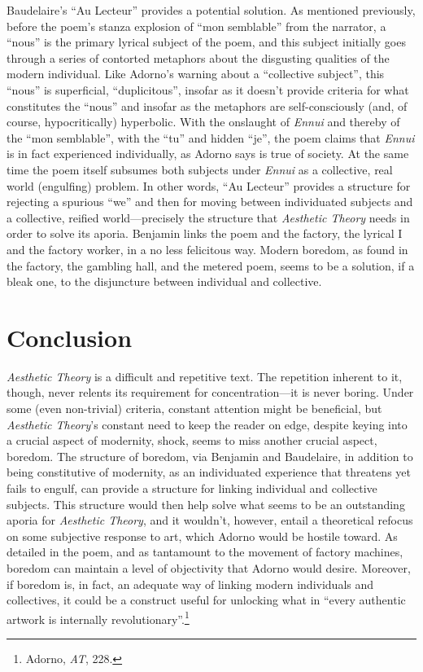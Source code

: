 \documentclass[12pt]{article}
\begin{document}
Baudelaire's ``Au Lecteur'' provides a potential solution. As mentioned previously, before the poem's stanza explosion of ``mon semblable'' from the narrator, a ``nous'' is the primary lyrical subject of the poem, and this subject initially goes through a series of contorted metaphors about the disgusting qualities of the modern individual. Like Adorno's warning about a ``collective subject'', this ``nous'' is superficial, ``duplicitous'', insofar as it doesn't provide criteria for what constitutes the ``nous'' and insofar as the metaphors are self-consciously (and, of course, hypocritically) hyperbolic. With the onslaught of \textit{Ennui} and thereby of the ``mon semblable'', with the ``tu'' and hidden ``je'', the poem claims that \textit{Ennui} is in fact experienced individually, as Adorno says is true of society. At the same time the poem itself subsumes both subjects under \textit{Ennui} as a collective, real world (engulfing) problem. In other words, ``Au Lecteur'' provides a structure for rejecting a spurious ``we'' and then for moving between individuated subjects and a collective, reified world---precisely the structure that \textit{Aesthetic Theory} needs in order to solve its aporia. Benjamin links the poem and the factory, the lyrical I and the factory worker, in a no less felicitous way. Modern boredom, as found in the factory, the gambling hall, and the metered poem, seems to be a solution, if a bleak one, to the disjuncture between individual and collective.

\section{Conclusion}
\textit{Aesthetic Theory} is a difficult and repetitive text. The repetition inherent to it, though, never relents its requirement for concentration---it is never boring. Under some (even non-trivial) criteria, constant attention might be beneficial, but \textit{Aesthetic Theory}'s constant need to keep the reader on edge, despite keying into a crucial aspect of modernity, shock, seems to miss another crucial aspect, boredom. The structure of boredom, via Benjamin and Baudelaire, in addition to being constitutive of modernity, as an individuated experience that threatens yet fails to engulf, can provide a structure for linking individual and collective subjects. This structure would then help solve what seems to be an outstanding aporia for \textit{Aesthetic Theory}, and it wouldn't, however, entail a theoretical refocus on some subjective response to art, which Adorno would be hostile toward. As detailed in the poem, and as tantamount to the movement of factory machines, boredom can maintain a level of objectivity that Adorno would desire. Moreover, if boredom is, in fact, an adequate way of linking modern individuals and collectives, it could be a construct useful for unlocking what in ``every authentic artwork is internally revolutionary''.\footnote{Adorno, \textit{AT}, 228.}
\end{document}
